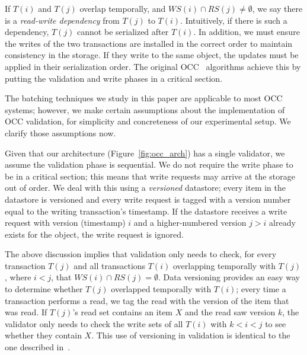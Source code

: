 If $T(i)$ and $T(j)$ overlap temporally, and $WS(i) \cap RS(j) \neq \emptyset$, we say there is a \emph{read-write dependency} from $T(j)$ to $T(i)$. Intuitively, if there is such a dependency, $T(j)$ cannot be serialized after $T(i)$. In addition, we must ensure the writes of the two transactions are installed in the correct order to maintain consistency in the storage. If they write to the same object, the updates must be applied in their serialization order. The original OCC~\cite{kung81tods} algorithms achieve this by putting the validation and write phases in a critical section.

The batching techniques we study in this paper are applicable to most OCC systems; however, we make certain assumptions about the implementation of OCC validation, for simplicity and concreteness of our experimental setup. We clarify those assumptions now.

Given that our architecture (Figure~\ref{fig:occ_arch}) has a single validator, we assume the validation phase is sequential. We do not require the write phase to be in a critical section; this means that write requests may arrive at the storage out of order. We deal with this using a \emph{versioned} datastore; every item in the datastore is versioned and every write request is tagged with a version number equal to the writing transaction's timestamp. If the datastore receives a write request with version (timestamp) $i$ and a higher-numbered version $j > i$ already exists for the object, the write request is ignored. 

The above discussion implies that validation only needs to check, for every transaction $T(j)$ and all transactions $T(i)$ overlapping temporally with $T(j)$, where $i<j$, that $WS(i) \cap RS(j) = \emptyset$. Data versioning provides an easy way to determine whether $T(j)$ overlapped temporally with $T(i)$; every time a transaction performs a read, we tag the read with the version of the item that was read. If $T(j)$'s read set contains an item $X$ and the read saw version $k$, the validator only needs to check the write sets of all $T(i)$ with $k < i < j$ to see whether they contain $X$. This use of versioning in validation is identical to the one described in~\cite{ding2015centiman}.
